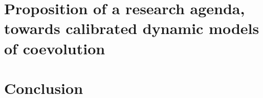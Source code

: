 \section{Proposition of a research agenda, towards calibrated dynamic models of coevolution}








\section{Conclusion}

















